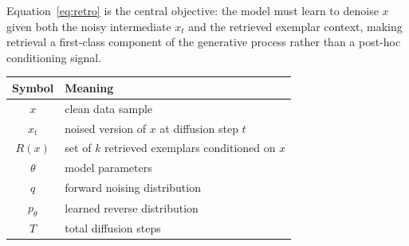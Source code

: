 \documentclass[11pt]{article}
\begin{document}
\noindent
Equation~\eqref{eq:retro} is the central objective: the model must learn to
denoise $x$ given both the noisy intermediate $x_t$ and the retrieved exemplar
context, making retrieval a first-class component of the generative process
rather than a post-hoc conditioning signal.

\bigskip
\begin{center}
\small
\renewcommand{\arraystretch}{1.3}
\begin{tabular}{cl}
  \toprule
  \textbf{Symbol} & \textbf{Meaning} \\
  \midrule
  $x$ & clean data sample \\
  $x_t$ & noised version of $x$ at diffusion step $t$ \\
  $R(x)$ & set of $k$ retrieved exemplars conditioned on $x$ \\
  $\theta$ & model parameters \\
  $q$ & forward noising distribution \\
  $p_\theta$ & learned reverse distribution \\
  $T$ & total diffusion steps \\
  \bottomrule
\end{tabular}
\end{center}
\end{document}
